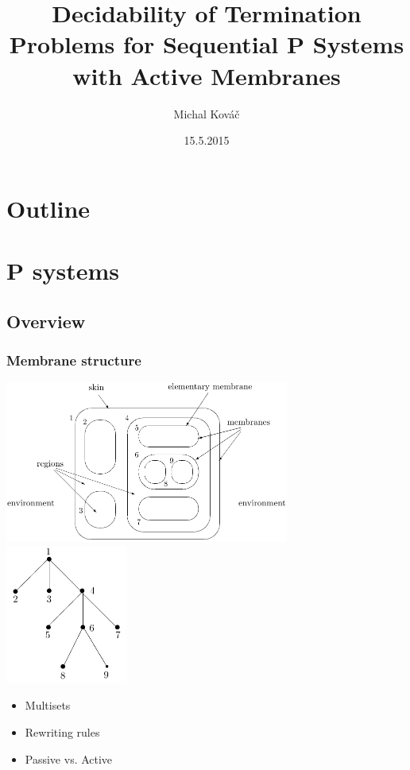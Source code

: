 \usepackage[utf8]{inputenc}
\usepackage{slovak}
\usepackage{tikz}
\usepackage{fancybox}
\usepackage[english]{babel}
\usetikzlibrary{arrows,positioning}

\title{Decidability of Termination Problems for Sequential P Systems with Active Membranes}
\author{Michal Kováč}
\date{15.5.2015}


\begin{frame}[t]
\titlepage
\end{frame}
\note{}

\section*{Outline}
\begin{frame}
\tableofcontents
\end{frame}
\note{}

\section{P systems} %
\label{sec:p_systems}

  \subsection{Overview} %
  \label{sub:overview}

    \begin{frame}[t]\frametitle{Membrane structure}
      \includegraphics[width=0.7\textwidth]{membrane_structure.png}
      \hfill
      \includegraphics[width=0.3\textwidth]{membrane_tree.png}
      \pause
      \begin{itemize}
        \item Multisets
        \pause
        \item Rewriting rules
        \pause
        \item Passive vs. Active
      \end{itemize}

    \end{frame}
    \note{}

